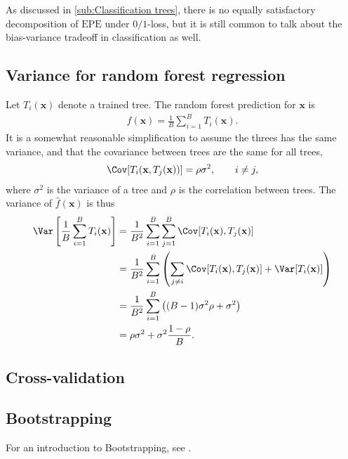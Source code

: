 As discussed in \ref{sub:Classification trees}, there is no equally satisfactory decomposition of $\mathrm{EPE}$ under $0/1$-loss, but it is still common to talk about the bias-variance tradeoff in classification as well.

\subsection{Variance for random forest regression}
\label{sub:Variance for random forest regression}
Let $T_i(\mathbf{x})$ denote a trained tree. The random forest prediction for $\mathbf{x}$ is 
\begin{align}
  \hat f(\mathbf{x}) = \frac{1}{B} \sum_{i = 1}^{B} T_i(\mathbf{x}).
\end{align}
It is a somewhat reasonable simplification to assume the threes has the same variance, and that the covariance between trees are the same for all trees,
\begin{align}
  \Cov[T_i(\mathbf{x}, T_j(\mathbf{x}))] = \rho \sigma^2, \quad \quad i \neq j,
\end{align}
where $\sigma^2$ is the variance of a tree and $\rho$ is the correlation between trees.  
The variance of $\hat f(\mathbf{x})$ is thus
\begin{align}
\Var\left[ \frac{1}{B} \sum_{i = 1}^{B} T_i(\mathbf{x}) \right] 
&= \frac{1}{B^2} \sum_{i =1}^B \sum_{j= 1}^B \Cov[T_i(\mathbf{x}), T_j(\mathbf{x})] \notag \\
&= \frac{1}{B^2} \sum_{i =1}^B \left(\sum_{j \neq i} \Cov[T_i(\mathbf{x}), T_j(\mathbf{x})] + \Var[T_i(\mathbf{x})]  \right)\notag \\
&= \frac{1}{B^2} \sum_{i =1}^B \left( (B-1) \sigma^2 \rho + \sigma^2  \right)\notag \\
&= \rho \sigma^2 + \sigma^2 \frac{1-\rho}{B}.
\end{align}


\subsection{Cross-validation}
\label{sec:Cross-validation}

\subsection{Bootstrapping}
\label{sec:Bootstrapping}
For an introduction to Bootstrapping, see \cite{efron1994bootstrap}.
